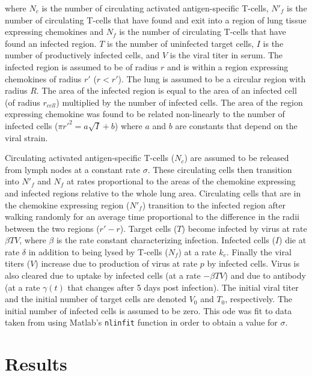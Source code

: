 \documentclass[10pt]{article}
\begin{document}
where $N_{c}$ is the number of circulating activated antigen-specific T-cells, $N'_{f}$ is the number of circulating T-cells that have found and exit into a region of lung tissue expressing chemokines and $N_{f}$ is the number of circulating T-cells that have found an infected region. $T$ is the number of uninfected target cells, $I$ is the number of productively infected cells, and $V$ is the viral titer in serum. The infected region is assumed to be of radius $r$ and is within a region expressing chemokines of radius $r'$ ($r  < r'$). The lung is assumed to be a circular region with radius $R$. The area of the infected region is equal to the area of an infected cell (of radius $r_{cell}$) multiplied by the number of infected cells. The area of the region expressing chemokine was found to be related non-linearly to the number of infected cells ($\pi r'^{2} = a \sqrt{I} + b$) where $a$ and $b$ are constants that depend on the viral strain.

Circulating activated antigen-specific T-cells ($N_{c}$) are assumed to be released from lymph nodes at a constant rate $\sigma$. These circulating cells then transition into $N'_{f}$ and $N_{f}$ at rates proportional to the areas of the chemokine expressing and infected regions relative to the whole lung area. Circulating cells that are in the chemokine expressing region ($N'_{f}$) transition to the infected region after walking randomly for an average time proportional to the difference in the radii between the two regions ($r' - r$). Target cells ($T$) become infected by virus at rate $\beta TV$, where $\beta$ is the rate constant characterizing infection. Infected cells ($I$) die at rate $\delta$ in addition to being lysed by T-cells ($N_{f}$) at a rate $k_{e}$. Finally the viral titers ($V$) increase due to production of virus at rate $p$ by infected cells. Virus is also cleared due to uptake by infected cells (at a rate $- \beta TV$) and due to antibody (at a rate $\gamma (t)$ that changes after 5 days post infection). The initial viral titer and the initial number of target cells are denoted $V_{0}$ and $T_{0}$, respectively. The initial number of infected cells is assumed to be zero. This ode was fit to data taken from \cite{Miao2010} using Matlab's \texttt{nlinfit} function in order to obtain a value for $\sigma$.

\section*{Results}
\end{document}
